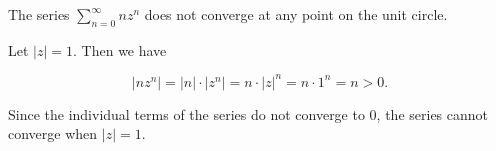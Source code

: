 The series $\sum\limits_{n=0}^{\infty}{n z^n}$ does not converge at any point on the unit circle.

\begin{solution}
    Let $|z| = 1$. Then we have

    $$
    |n z^n| = |n| \cdot |z^n| = n \cdot |z|^n = n \cdot 1^n = n > 0.
    $$

    Since the individual terms of the series do not converge to $0$, the series cannot converge when $|z| = 1$.
    \ \\
\end{solution}